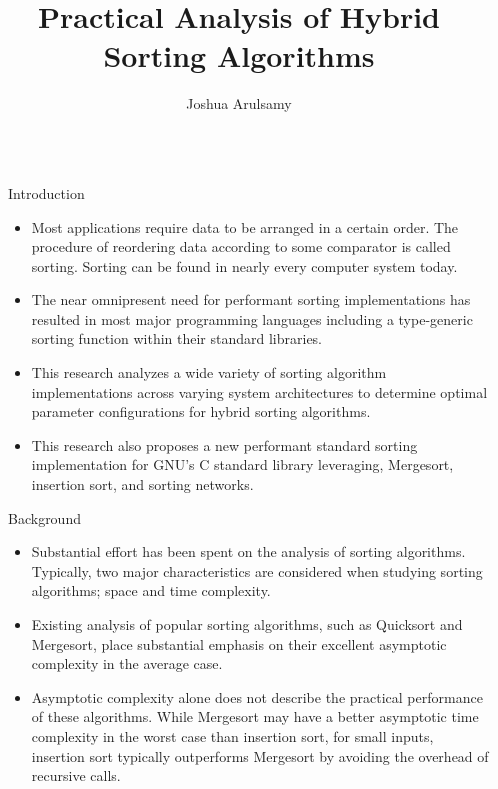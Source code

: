 \documentclass[final]{beamer}
\title{Practical Analysis of Hybrid Sorting Algorithms}
\author{Joshua Arulsamy}
\institute[shortinst]{Department of Electrical Engineering and Computer Science, University of Wyoming}
\newlength{\sepwidth}
\newlength{\colwidth}
\newcommand{\separatorcolumn}{\begin{column}{\sepwidth}\end{column}}
\begin{document}

\begin{frame}[t]
	\begin{columns}[t]
		\separatorcolumn

		\begin{column}{\colwidth}

			\begin{block}{Introduction}
				\begin{itemize}
					\item Most applications require data to be arranged in a certain order.
					      The procedure of reordering data according to some comparator is
					      called sorting. Sorting can be found in nearly every computer
					      system today.
					\item The near omnipresent need for
					      performant sorting implementations has resulted in most major
					      programming languages including a type-generic sorting function
					      within their standard libraries.
					\item This research analyzes a wide variety of sorting
					      algorithm implementations across varying system architectures to
					      determine optimal parameter configurations for hybrid sorting
					      algorithms.
					\item This research also proposes a new performant standard
					      sorting implementation for GNU's C standard library
					      leveraging, Mergesort, insertion sort, and sorting
					      networks.
				\end{itemize}
			\end{block}

			\begin{block}{Background}
				\begin{itemize}
					\item Substantial effort has been spent on the analysis of
					      sorting algorithms. Typically, two major characteristics
					      are considered when studying sorting algorithms; space
					      and time complexity.
					\item Existing analysis of popular sorting algorithms, such as Quicksort
					      and Mergesort, place substantial emphasis on their excellent
					      asymptotic complexity in the average case\parencite{glibc}.
					\item Asymptotic complexity alone does not describe the
					      practical performance of these algorithms. While Mergesort may
					      have a better asymptotic time complexity in the worst case than
					      insertion sort, for small inputs, insertion sort typically
					      outperforms Mergesort by avoiding the overhead of recursive calls.
				\end{itemize}
			\end{block}


\end{column}
\end{columns}
\end{frame}
\end{document}
